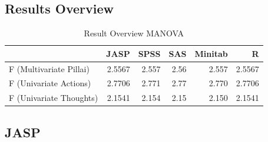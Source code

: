 \documentclass[
]{book}
\begin{document}
\hypertarget{results-overview-6}{%
\subsection{Results Overview}\label{results-overview-6}}

\begin{table}

\caption{\label{tab:unnamed-chunk-74}Result Overview MANOVA}
\centering
\begin{tabular}[t]{lrrrrr}
\toprule
  & JASP & SPSS & SAS & Minitab & R\\
\midrule
F (Multivariate Pillai) & 2.5567 & 2.557 & 2.56 & 2.557 & 2.5567\\
F (Univariate Actions) & 2.7706 & 2.771 & 2.77 & 2.770 & 2.7706\\
F (Univariate Thoughts) & 2.1541 & 2.154 & 2.15 & 2.150 & 2.1541\\
\bottomrule
\end{tabular}
\end{table}

\hypertarget{jasp-6}{%
\subsection{JASP}\label{jasp-6}}
\end{document}
